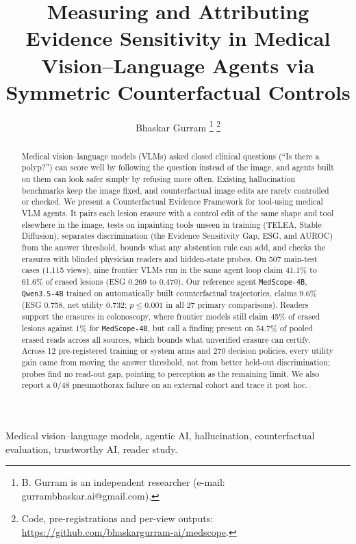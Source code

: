 \documentclass[journal]{IEEEtran}
\begin{document}
\title{Measuring and Attributing Evidence Sensitivity in Medical Vision--Language Agents via Symmetric Counterfactual Controls}
\author{Bhaskar Gurram%
\thanks{B. Gurram is an independent researcher (e-mail: gurrambhaskar.ai@gmail.com).}%
\thanks{Code, pre-registrations and per-view outputs: \url{https://github.com/bhaskargurram-ai/medscope}.}}
\maketitle

\begin{abstract}
Medical vision--language models (VLMs) asked closed clinical questions (``Is there a polyp?'') can score well by following the question instead of the image, and agents built on them can look safer simply by refusing more often. Existing hallucination benchmarks keep the image fixed, and counterfactual image edits are rarely controlled or checked. We present a Counterfactual Evidence Framework for tool-using medical VLM agents. It pairs each lesion erasure with a control edit of the same shape and tool elsewhere in the image, tests on inpainting tools unseen in training (TELEA, Stable Diffusion), separates discrimination (the Evidence Sensitivity Gap, ESG, and AUROC) from the answer threshold, bounds what any abstention rule can add, and checks the erasures with blinded physician readers and hidden-state probes. On 507 main-test cases (1,115 views), nine frontier VLMs run in the same agent loop claim 41.1\% to 61.6\% of erased lesions (ESG 0.269 to 0.470). Our reference agent \texttt{MedScope-4B}, \texttt{Qwen3.5-4B} trained on automatically built counterfactual trajectories, claims 9.6\% (ESG 0.758, net utility 0.732; $p \le 0.001$ in all 27 primary comparisons). Readers support the erasures in colonoscopy, where frontier models still claim 45\% of erased lesions against 1\% for \texttt{MedScope-4B}, but call a finding present on 54.7\% of pooled erased reads across all sources, which bounds what unverified erasure can certify. Across 12 pre-registered training or system arms and 270 decision policies, every utility gain came from moving the answer threshold, not from better held-out discrimination; probes find no read-out gap, pointing to perception as the remaining limit. We also report a 0/48 pneumothorax failure on an external cohort and trace it post hoc.
\end{abstract}

\begin{IEEEkeywords}
Medical vision--language models, agentic AI, hallucination, counterfactual evaluation, trustworthy AI, reader study.
\end{IEEEkeywords}
\end{document}
